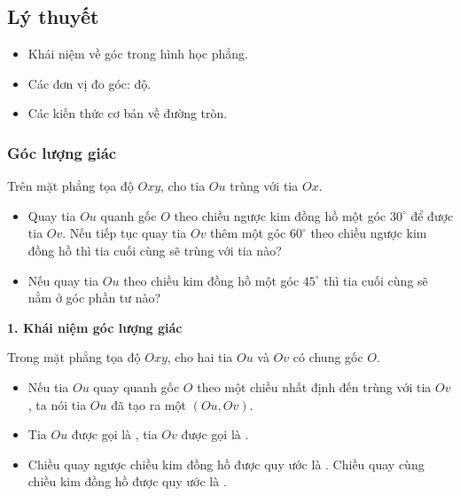 


\subsection{Lý thuyết}

\begin{emdahoc}
\begin{itemize}
    \item Khái niệm về góc trong hình học phẳng.
    \item Các đơn vị đo góc: độ.
    \item Các kiến thức cơ bản về đường tròn.
\end{itemize}
\end{emdahoc}

\subsubsection{Góc lượng giác}
\begin{hoatdong}
Trên mặt phẳng tọa độ $Oxy$, cho tia $Ou$ trùng với tia $Ox$.
\begin{itemize}
    \item Quay tia $Ou$ quanh gốc $O$ theo chiều ngược kim đồng hồ một góc $30^\circ$ để được tia $Ov$. Nếu tiếp tục quay tia $Ov$ thêm một góc $60^\circ$ theo chiều ngược kim đồng hồ thì tia cuối cùng sẽ trùng với tia nào?
    \item Nếu quay tia $Ou$ theo chiều kim đồng hồ một góc $45^\circ$ thì tia cuối cùng sẽ nằm ở góc phần tư nào?
\end{itemize}
\end{hoatdong}

\begin{kienthuc}
\textbf{1. Khái niệm góc lượng giác}

Trong mặt phẳng tọa độ $Oxy$, cho hai tia $Ou$ và $Ov$ có chung gốc $O$.
\begin{itemize}
    \item Nếu tia $Ou$ quay quanh gốc $O$ theo một chiều nhất định đến trùng với tia $Ov$, ta nói tia $Ou$ đã tạo ra một  $(Ou, Ov)$.
    \item Tia $Ou$ được gọi là , tia $Ov$ được gọi là .
    \item Chiều quay ngược chiều kim đồng hồ được quy ước là . Chiều quay cùng chiều kim đồng hồ được quy ước là .
\end{itemize}
\end{kienthuc}

